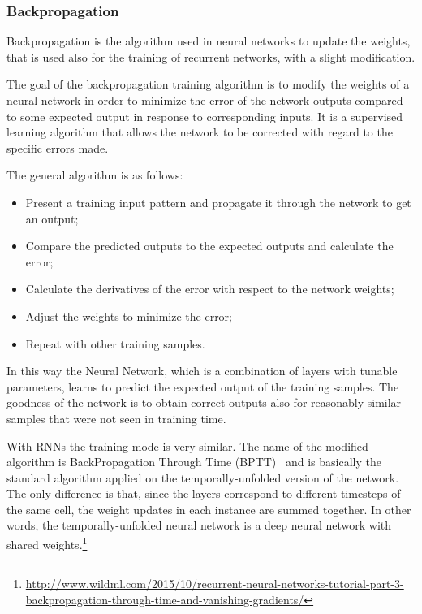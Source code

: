 \subsubsection{Backpropagation}
Backpropagation is the algorithm used in neural networks to update the weights, that is used also for the training of recurrent networks, with a slight modification.

The goal of the backpropagation training algorithm is to modify the weights of a neural network in order to minimize the error of the network outputs compared to some expected output in response to corresponding inputs. It is a supervised learning algorithm that allows the network to be corrected with regard to the specific errors made.

The general algorithm is as follows:

\begin{itemize}
	\item Present a training input pattern and propagate it through the network to get an output;

	\item Compare the predicted outputs to the expected outputs and calculate the error;

	\item Calculate the derivatives of the error with respect to the network weights;

	\item Adjust the weights to minimize the error;

	\item Repeat with other training samples.
\end{itemize}

In this way the Neural Network, which is a combination of layers with tunable parameters, learns to predict the expected output of the training samples. The goodness of the network is to obtain correct outputs also for reasonably similar samples that were not seen in training time.

With RNNs the training mode is very similar. The name of the modified algorithm is BackPropagation Through Time (BPTT)~\cite{werbos1990backpropagation} and is basically the standard algorithm applied on the temporally-unfolded version of the network. The only difference is that, since the layers correspond to different timesteps of the same cell, the weight updates in each instance are summed together. In other words, the temporally-unfolded neural network is a deep neural network with shared weights.\footnote{\url{http://www.wildml.com/2015/10/recurrent-neural-networks-tutorial-part-3-backpropagation-through-time-and-vanishing-gradients/}}

